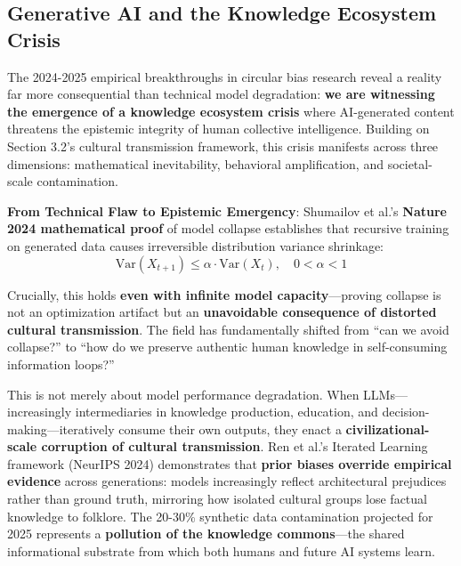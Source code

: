 \documentclass[11pt,a4paper]{article}
\begin{document}
\subsection{Generative AI and the Knowledge Ecosystem Crisis}

The 2024-2025 empirical breakthroughs in circular bias research reveal a reality far more consequential than technical model degradation: \textbf{we are witnessing the emergence of a knowledge ecosystem crisis} where AI-generated content threatens the epistemic integrity of human collective intelligence. Building on Section 3.2's cultural transmission framework, this crisis manifests across three dimensions: mathematical inevitability, behavioral amplification, and societal-scale contamination.

\textbf{From Technical Flaw to Epistemic Emergency}:
Shumailov et al.'s \cite{shumailov2024} \textbf{Nature 2024 mathematical proof} of model collapse establishes that recursive training on generated data causes irreversible distribution variance shrinkage:
\begin{equation}
\text{Var}(X_{t+1}) \leq \alpha \cdot \text{Var}(X_t), \quad 0 < \alpha < 1
\end{equation}

Crucially, this holds \textbf{even with infinite model capacity}—proving collapse is not an optimization artifact but an \textbf{unavoidable consequence of distorted cultural transmission}. The field has fundamentally shifted from ``can we avoid collapse?'' to ``how do we preserve authentic human knowledge in self-consuming information loops?''

This is not merely about model performance degradation. When LLMs—increasingly intermediaries in knowledge production, education, and decision-making—iteratively consume their own outputs, they enact a \textbf{civilizational-scale corruption of cultural transmission}. Ren et al.'s \cite{ren2024} Iterated Learning framework (NeurIPS 2024) demonstrates that \textbf{prior biases override empirical evidence} across generations: models increasingly reflect architectural prejudices rather than ground truth, mirroring how isolated cultural groups lose factual knowledge to folklore. The 20-30\% synthetic data contamination projected for 2025 \cite{ferrara2023,shumailov2024} represents a \textbf{pollution of the knowledge commons}—the shared informational substrate from which both humans and future AI systems learn.
\end{document}
